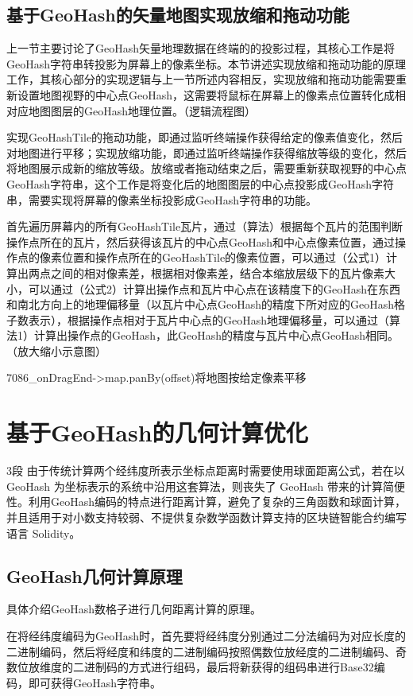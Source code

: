 \subsection{基于GeoHash的矢量地图实现放缩和拖动功能}

上一节主要讨论了GeoHash矢量地理数据在终端的的投影过程，其核心工作是将GeoHash字符串转投影为屏幕上的像素坐标。本节讲述实现放缩和拖动功能的原理工作，其核心部分的实现逻辑与上一节所述内容相反，实现放缩和拖动功能需要重新设置地图视野的中心点GeoHash，这需要将鼠标在屏幕上的像素点位置转化成相对应地图图层的GeoHash地理位置。（逻辑流程图）

实现GeoHashTile的拖动功能，即通过监听终端操作获得给定的像素值变化，然后对地图进行平移；实现放缩功能，即通过监听终端操作获得缩放等级的变化，然后将地图展示成新的缩放等级。放缩或者拖动结束之后，需要重新获取视野的中心点GeoHash字符串，这个工作是将变化后的地图图层的中心点投影成GeoHash字符串，需要实现将屏幕的像素坐标投影成GeoHash字符串的功能。

首先遍历屏幕内的所有GeoHashTile瓦片，通过（算法）根据每个瓦片的范围判断操作点所在的瓦片，然后获得该瓦片的中心点GeoHash和中心点像素位置，通过操作点的像素位置和操作点所在的GeoHashTile的像素位置，可以通过（公式1）计算出两点之间的相对像素差，根据相对像素差，结合本缩放层级下的瓦片像素大小，可以通过（公式2）计算出操作点和瓦片中心点在该精度下的GeoHash在东西和南北方向上的地理偏移量（以瓦片中心点GeoHash的精度下所对应的GeoHash格子数表示），根据操作点相对于瓦片中心点的GeoHash地理偏移量，可以通过（算法1）计算出操作点的GeoHash，此GeoHash的精度与瓦片中心点GeoHash相同。（放大缩小示意图）

7086_onDragEnd->map.panBy(offset)将地图按给定像素平移

\section{基于GeoHash的几何计算优化}3段
由于传统计算两个经纬度所表示坐标点距离时需要使用球面距离公式，若在以 GeoHash 为坐标表示的系统中沿用这套算法，则丧失了 GeoHash 带来的计算简便性。利用GeoHash编码的特点进行距离计算，避免了复杂的三角函数和球面计算，并且适用于对小数支持较弱、不提供复杂数学函数计算支持的区块链智能合约编写语言 Solidity。

\subsection{GeoHash几何计算原理}
具体介绍GeoHash数格子进行几何距离计算的原理。

在将经纬度编码为GeoHash时，首先要将经纬度分别通过二分法编码为对应长度的二进制编码，然后将经度和纬度的二进制编码按照偶数位放经度的二进制编码、奇数位放维度的二进制码的方式进行组码，最后将新获得的组码串进行Base32编码，即可获得GeoHash字符串。

